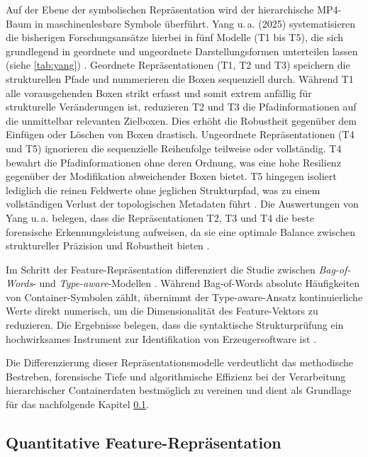Auf der Ebene der symbolischen Repräsentation wird der hierarchische MP4-Baum in maschinenlesbare Symbole überführt. Yang u.\,a. (2025) systematisieren die bisherigen Forschungsansätze hierbei in fünf Modelle (T1 bis T5), die sich grundlegend in geordnete und ungeordnete Darstellungsformen unterteilen lassen (siehe \cref{tab:yang}) \cite[Kap. 4.3.2]{yang_comprehensive_2025}. Geordnete Repräsentationen (T1, T2 und T3) speichern die strukturellen Pfade und nummerieren die Boxen sequenziell durch. Während T1 alle vorausgehenden Boxen strikt erfasst und somit extrem anfällig für strukturelle Veränderungen ist, reduzieren T2 und T3 die Pfadinformationen auf die unmittelbar relevanten Zielboxen. Dies erhöht die Robustheit gegenüber dem Einfügen oder Löschen von Boxen drastisch. Ungeordnete Repräsentationen (T4 und T5) ignorieren die sequenzielle Reihenfolge teilweise oder vollständig. T4 bewahrt die Pfadinformationen ohne deren Ordnung, was eine hohe Resilienz gegenüber der Modifikation abweichender Boxen bietet. T5 hingegen isoliert lediglich die reinen Feldwerte ohne jeglichen Strukturpfad, was zu einem vollständigen Verlust der topologischen Metadaten führt \cite[Kap. 4.3.2]{yang_comprehensive_2025}. Die Auswertungen von Yang u.\,a. belegen, dass die Repräsentationen T2, T3 und T4 die beste forensische Erkennungsleistung aufweisen, da sie eine optimale Balance zwischen struktureller Präzision und Robustheit bieten \cite[Kap. 5]{yang_comprehensive_2025}.

Im Schritt der Feature-Repräsentation differenziert die Studie zwischen \textit{Bag-of-Words}- und \textit{Type-aware}-Modellen \cite[Kap. 4.3.4]{yang_comprehensive_2025}. Während Bag-of-Words absolute Häufigkeiten von Container-Symbolen zählt, übernimmt der Type-aware-Ansatz kontinuierliche Werte direkt numerisch, um die Dimensionalität des Feature-Vektors zu reduzieren. Die Ergebnisse belegen, dass die syntaktische Strukturprüfung ein hochwirksames Instrument zur Identifikation von Erzeugersoftware ist \cite{yang_comprehensive_2025}. 

Die Differenzierung dieser Repräsentationsmodelle verdeutlicht das methodische Bestreben, forensische Tiefe und algorithmische Effizienz bei der Verarbeitung hierarchischer Containerdaten bestmöglich zu vereinen und dient als Grundlage für das nachfolgende Kapitel \ref{sec:quant}.\\


\subsection{Quantitative Feature-Repräsentation}
\label{sec:quant}

